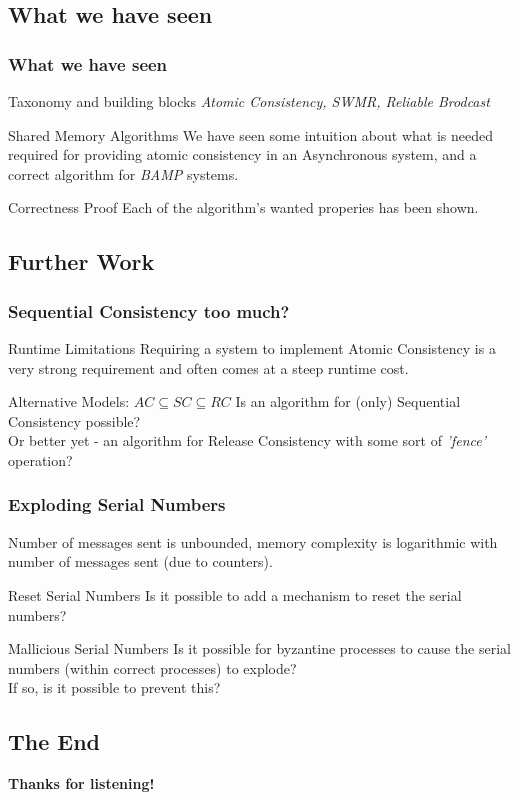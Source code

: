\subsection{What we have seen}
\begin{frame}
    \frametitle{What we have seen}
    \begin{block}{Taxonomy and building blocks}
        \emph{Atomic Consistency, SWMR, Reliable Brodcast}
    \end{block}
    \begin{block}{Shared Memory Algorithms}
        We have seen some intuition
        about what is needed required for providing atomic consistency
        in an Asynchronous system, and a correct algorithm for \emph{BAMP} systems.
    \end{block}
    \begin{block}{Correctness Proof}
        Each of the algorithm's wanted properies has been shown.
    \end{block}
\end{frame}

\subsection{Further Work}
\begin{frame}
    \frametitle{Sequential Consistency too much?}
    \begin{alertblock}{Runtime Limitations}
        Requiring a system to implement Atomic Consistency is a very strong requirement
        and often comes at a steep runtime cost.
    \end{alertblock}
    \begin{block}{Alternative Models: $AC\subseteq SC\subseteq RC$}
        Is an algorithm for (only) Sequential Consistency possible?\\
        Or better yet - an algorithm for Release Consistency with some sort of
        \emph{'fence'} operation?
    \end{block}
\end{frame}

\begin{frame}
    \frametitle{Exploding Serial Numbers}
    Number of messages sent is unbounded, memory complexity
    is logarithmic with number of messages sent (due to counters).
    \begin{block}{Reset Serial Numbers}
        Is it possible to add a mechanism to reset the serial numbers?
    \end{block}
    \begin{block}{Mallicious Serial Numbers}
        Is it possible for byzantine processes to cause the serial numbers (within correct processes) to explode?\\
        If so, is it possible to prevent this?
    \end{block}
\end{frame}

\subsection{The End}
\begin{frame}
    \begin{center}
        \textbf{Thanks for listening!}
    \end{center}
\end{frame}